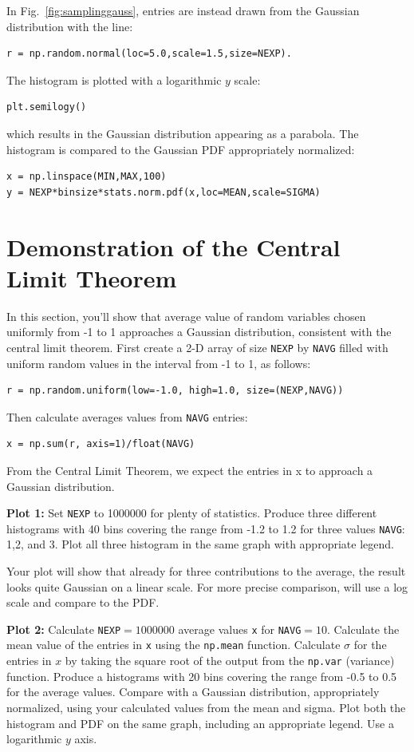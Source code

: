In Fig.~\ref{fig:samplinggauss}, entries are instead drawn from the Gaussian distribution with the line:
\begin{verbatim}
r = np.random.normal(loc=5.0,scale=1.5,size=NEXP).
\end{verbatim}
The histogram is plotted with a logarithmic $y$ scale:
\begin{verbatim}
plt.semilogy()
\end{verbatim}
which results in the Gaussian distribution appearing as a parabola.  The histogram is compared to the Gaussian PDF appropriately normalized:
\begin{verbatim}
x = np.linspace(MIN,MAX,100)
y = NEXP*binsize*stats.norm.pdf(x,loc=MEAN,scale=SIGMA)
\end{verbatim}


\section{Demonstration of the Central Limit Theorem}

In this section, you'll show that average value of random variables
chosen uniformly from -1 to 1 approaches a Gaussian distribution,
consistent with the central limit theorem.  First create a 2-D array
of size {\tt NEXP} by {\tt NAVG} filled with uniform random values in
the interval from -1 to 1, as follows:
\begin{verbatim}
r = np.random.uniform(low=-1.0, high=1.0, size=(NEXP,NAVG))
\end{verbatim}
Then calculate averages values from {\tt NAVG} entries:
\begin{verbatim}
x = np.sum(r, axis=1)/float(NAVG)  
\end{verbatim}
From the Central Limit Theorem, we expect the entries in x to approach a Gaussian distribution.

{\bf Plot 1:} Set {\tt NEXP} to 1000000 for plenty of statistics.
Produce three different histograms with 40 bins covering the range
from -1.2 to 1.2 for three values {\tt NAVG}: 1,2, and 3.  Plot all
three histogram in the same graph with appropriate legend.

Your plot will show that already for three contributions to the average, the result looks quite Gaussian on a linear scale.  For more precise comparison, will use a log scale and compare to the PDF.

{\bf Plot 2:} Calculate {\tt NEXP}$=1000000$ average values {\tt x} for {\tt NAVG}$=10$.  Calculate the mean value of the entries in {\tt x} using the {\tt np.mean} function.  Calculate $\sigma$ for the entries in $x$ by taking the square root of the output from the {\tt np.var} (variance) function.  Produce a histograms with 20 bins covering the range
from -0.5 to 0.5 for the average values.  Compare with a Gaussian distribution, appropriately normalized, using your calculated values from the  mean and sigma.  Plot both the histogram and PDF on the same graph, including an appropriate legend.  Use a logarithmic $y$ axis.


